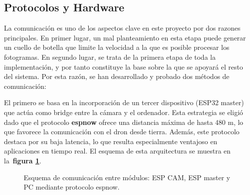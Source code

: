       \subsection{Protocolos y Hardware}
La comunicación es uno de los aspectos clave en este proyecto por dos razones principales. En primer lugar, un mal planteamiento en esta etapa puede generar un cuello de botella que limite la velocidad a la que es posible procesar los fotogramas. En segundo lugar, se trata de la primera etapa de toda la implementación, y por tanto constituye la base sobre la que se apoyará el resto del sistema. Por esta razón, se han desarrollado y probado dos métodos de comunicación:

El primero se basa en la incorporación de un tercer dispositivo (ESP32 master) que actúa como bridge entre la cámara y el ordenador. Esta estrategia se eligió dado que el protocolo \textbf{espnow} ofrece una distancia máxima de hasta 480 m, lo que favorece la comunicación con el dron desde tierra. Además, este protocolo destaca por su baja latencia, lo que resulta especialmente ventajoso en aplicaciones en tiempo real. El esquema de esta arquitectura se muestra en la~\textbf{figura \ref{fig:comms_esquema_espnow}}.

\vspace{1cm}
\begin{figure}[H] %
    \centering
    \caption{Esquema de comunicación entre módulos: ESP CAM, ESP master y PC mediante protocolo espnow.}
    \label{fig:comms_esquema_espnow}
\end{figure}


